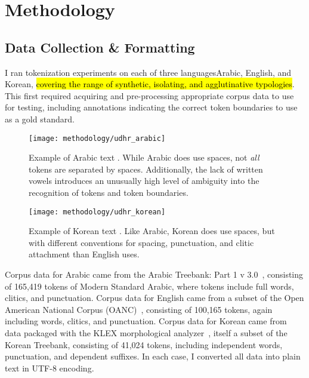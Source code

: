 \chapter{Methodology}


\section{Data Collection \& Formatting}
I ran tokenization experiments on each of three languages\textemdash Arabic, English, and Korean, \hl{covering the range of synthetic, isolating, and agglutinative typologies}. This first required acquiring and pre-processing appropriate corpus data to use for testing, including annotations indicating the correct token boundaries to use as a gold standard.

\begin{figure}
	\begin{center}
		\texttt{[image: methodology/udhr\_arabic]}
		\caption[Example of Arabic Text]{Example of Arabic text \cite{omniara}. While Arabic does use spaces, not \textit{all} tokens are separated by spaces. Additionally, the lack of written vowels introduces an unusually high level of ambiguity into the recognition of tokens and token boundaries.}
		\label{aratext}
	\end{center}
\end{figure}

\begin{figure}
	\begin{center}
		\texttt{[image: methodology/udhr\_korean]}
		\caption[Example of Korean Text]{Example of Korean text \cite{omnikor}. Like Arabic, Korean does use spaces, but with different conventions for spacing, punctuation, and clitic attachment than English uses.}
		\label{kortext}
	\end{center}
\end{figure}

Corpus data for Arabic came from the Arabic Treebank: Part 1 v 3.0~\cite{maamouri05}, consisting of 165,419 tokens of Modern Standard Arabic, where tokens include full words, clitics, and punctuation. Corpus data for English came from a subset of the Open American National Corpus (OANC)~\cite{oanc}, consisting of 100,165 tokens, again including words, clitics, and punctuation. Corpus data for Korean came from data packaged with the KLEX morphological analyzer~\cite{han04}, itself a subset of the Korean Treebank, consisting of 41,024 tokens, including independent words, punctuation, and dependent suffixes. In each case, I converted all data into plain text in UTF-8 encoding.

